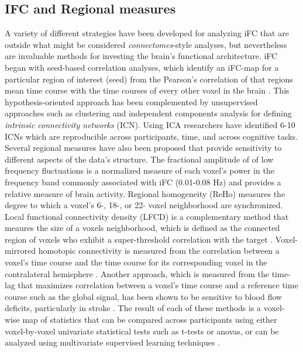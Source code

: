 \subsection{IFC and Regional measures}

A variety of different strategies have been developed for analyzing iFC that are outside what might be considered \emph{connectomes}-style analyses, but nevertheless are invaluable methods for investing the brain's functional architecture. iFC began with seed-based correlation analyses, which identify an iFC-map for a particular region of interest (seed) from the Pearson's correlation of that regions mean time course with the time courses of every other voxel in the brain \cite{biswal1995}. This hypothesis-oriented approach has been complemented by unsupervised approaches such as clustering and independent components analysis for defining \emph{intrinsic connectivity networks} (ICN). Using ICA researchers have identified 6-10 ICNs which are reproducible across participants\cite{beckmann,damasoix}, time\cite{zuo}, and across cognitive tasks\cite{smith2009}. Several regional measures have also been proposed that provide sensitivity to different aspects of the data's structure. The fractional amplitude of of low frequency fluctuations is a normalized measure of each voxel's power in the frequency band commonly associated with iFC (0.01-0.08 Hz) and provides a relative measure of brain activity\cite{zang}. Regional homogeneity (ReHo) measures the degree to which a voxel's 6-, 18-, or 22- voxel neighborhood are synchronized\cite{}. Local functional connectivity density (LFCD) is a complementary method that meaures the size of a voxels neighborhood, which is defined as the connected region of voxels who exhibit a super-threshold correlation with the target \cite{Tomasi}. Voxel-mirrored homotopic connectivity is measured from the correlation between a voxel's time course and the time course for its corresponding voxel in the contralateral hemisphere \cite{VMHC}. Another approach, which is measured from the time-lag that maximizes correlation between a voxel's time course and a reference time course such as the global signal, has been shown to be sensitive to blood flow deficits, particularly in stroke \cite{lv}. The result of each of these methods is a voxel-wise map of statistics that can be compared across participants using either voxel-by-voxel univariate statistical tests such as t-tests or anovas, or can be analyzed using multivariate supervised learning techniques \cite{ReHoPrediction}.

